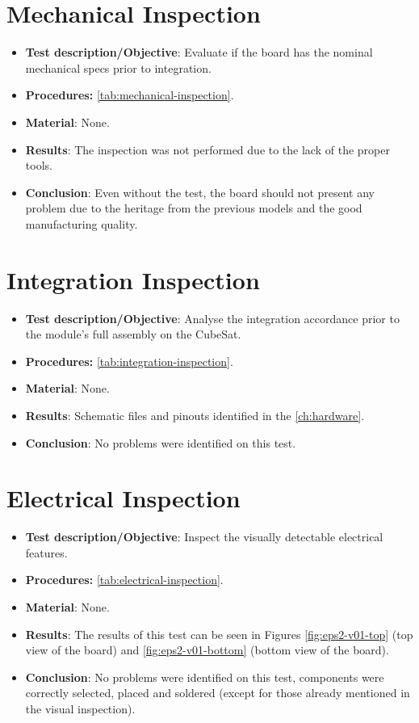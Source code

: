 \section{Mechanical Inspection}

\begin{itemize}
    \item \textbf{Test description/Objective}: Evaluate if the board has the nominal mechanical specs prior to integration.
    \item \textbf{Procedures:} \autoref{tab:mechanical-inspection}.
    \item \textbf{Material}: None.
    \item \textbf{Results}: The inspection was not performed due to the lack of the proper tools.
    \item \textbf{Conclusion}: Even without the test, the board should not present any problem due to the heritage from the previous models and the good manufacturing quality.
\end{itemize}


\section{Integration Inspection}

\begin{itemize}
    \item \textbf{Test description/Objective}: Analyse the integration accordance prior to the module’s full assembly on the CubeSat.
    \item \textbf{Procedures:} \autoref{tab:integration-inspection}.
    \item \textbf{Material}: None.
    \item \textbf{Results}: Schematic files and pinouts identified in the \autoref{ch:hardware}. 
    \item \textbf{Conclusion}: No problems were identified on this test.
\end{itemize}


\section{Electrical Inspection}

\begin{itemize}
    \item \textbf{Test description/Objective}: Inspect the visually detectable electrical features.
    \item \textbf{Procedures:} \autoref{tab:electrical-inspection}.
    \item \textbf{Material}: None.
    \item \textbf{Results}: The results of this test can be seen in Figures \ref{fig:eps2-v01-top} (top view of the board) and \ref{fig:eps2-v01-bottom} (bottom view of the board).
    \item \textbf{Conclusion}: No problems were identified on this test, components were correctly selected, placed and soldered (except for those already mentioned in the visual inspection).
\end{itemize}


